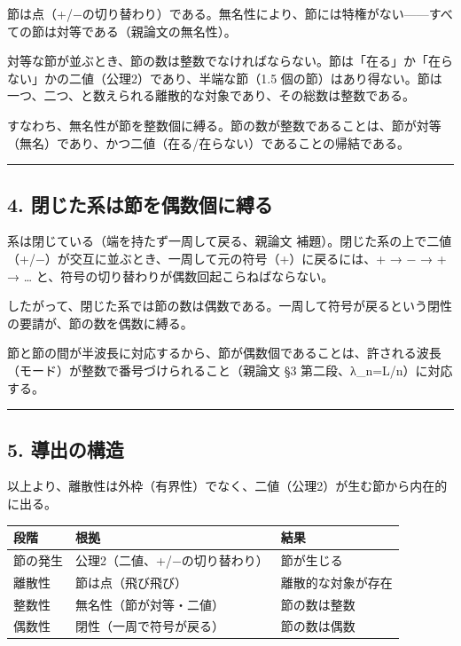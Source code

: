 \documentclass[11pt]{ltjsarticle}
\newcounter{none}
\begin{document}
節は点（+/−の切り替わり）である。無名性により、節には特権がない------すべての節は対等である（親論文の無名性）。

対等な節が並ぶとき、節の数は整数でなければならない。節は「在る」か「在らない」かの二値（公理2）であり、半端な節（1.5
個の節）はあり得ない。節は一つ、二つ、と数えられる離散的な対象であり、その総数は整数である。

すなわち、無名性が節を整数個に縛る。節の数が整数であることは、節が対等（無名）であり、かつ二値（在る/在らない）であることの帰結である。

\begin{center}\rule{0.5\linewidth}{0.5pt}\end{center}

\subsection{4.
閉じた系は節を偶数個に縛る}\label{ux9589ux3058ux305fux7cfbux306fux7bc0ux3092ux5076ux6570ux500bux306bux7e1bux308b}

系は閉じている（端を持たず一周して戻る、親論文
補題）。閉じた系の上で二値（+/−）が交互に並ぶとき、一周して元の符号（+）に戻るには、+
→ − → + → \ldots{} と、符号の切り替わりが偶数回起こらねばならない。

したがって、閉じた系では節の数は偶数である。一周して符号が戻るという閉性の要請が、節の数を偶数に縛る。

節と節の間が半波長に対応するから、節が偶数個であることは、許される波長（モード）が整数で番号づけられること（親論文
§3 第二段、λ\_n=L/n）に対応する。

\begin{center}\rule{0.5\linewidth}{0.5pt}\end{center}

\subsection{5. 導出の構造}\label{ux5c0eux51faux306eux69cbux9020}

以上より、離散性は外枠（有界性）でなく、二値（公理2）が生む節から内在的に出る。

{\def\LTcaptype{none} %
\begin{longtable}[]{@{}lll@{}}
\toprule\noalign{}
段階 & 根拠 & 結果 \\
\midrule\noalign{}
\endhead
\bottomrule\noalign{}
\endlastfoot
節の発生 & 公理2（二値、+/−の切り替わり） & 節が生じる \\
離散性 & 節は点（飛び飛び） & 離散的な対象が存在 \\
整数性 & 無名性（節が対等・二値） & 節の数は整数 \\
偶数性 & 閉性（一周で符号が戻る） & 節の数は偶数 \\
\end{longtable}
}
\end{document}
